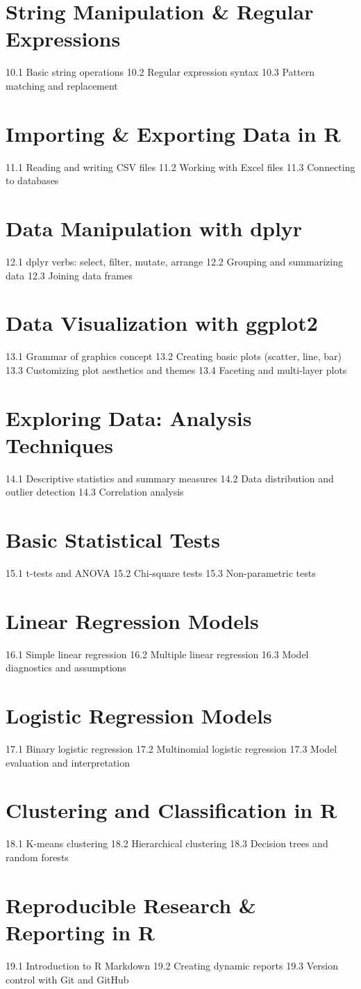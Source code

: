 \section{String Manipulation \& Regular Expressions}
10.1 Basic string operations
10.2 Regular expression syntax
10.3 Pattern matching and replacement
\section{Importing \& Exporting Data in R}
11.1 Reading and writing CSV files
11.2 Working with Excel files
11.3 Connecting to databases
\section{Data Manipulation with dplyr}
12.1 dplyr verbs: select, filter, mutate, arrange
12.2 Grouping and summarizing data
12.3 Joining data frames
\section{Data Visualization with ggplot2}
13.1 Grammar of graphics concept
13.2 Creating basic plots (scatter, line, bar)
13.3 Customizing plot aesthetics and themes
13.4 Faceting and multi-layer plots
\section{Exploring Data: Analysis Techniques}
14.1 Descriptive statistics and summary measures
14.2 Data distribution and outlier detection
14.3 Correlation analysis
\section{Basic Statistical Tests}
15.1 t-tests and ANOVA
15.2 Chi-square tests
15.3 Non-parametric tests
\section{Linear Regression Models}
16.1 Simple linear regression
16.2 Multiple linear regression
16.3 Model diagnostics and assumptions
\section{Logistic Regression Models}
17.1 Binary logistic regression
17.2 Multinomial logistic regression
17.3 Model evaluation and interpretation
\section{Clustering and Classification in R}
18.1 K-means clustering
18.2 Hierarchical clustering
18.3 Decision trees and random forests
\section{Reproducible Research \& Reporting in R}
19.1 Introduction to R Markdown
19.2 Creating dynamic reports
19.3 Version control with Git and GitHub
